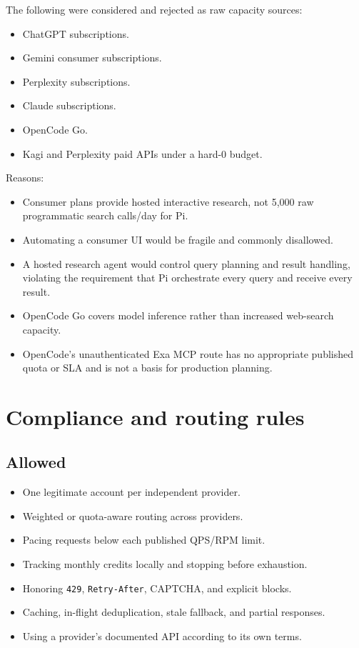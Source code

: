 \documentclass[11pt]{article}
\begin{document}
The following were considered and rejected as raw capacity sources:

\begin{itemize}
\item ChatGPT subscriptions.
\item Gemini consumer subscriptions.
\item Perplexity subscriptions.
\item Claude subscriptions.
\item OpenCode Go.
\item Kagi and Perplexity paid APIs under a hard-0 budget.
\end{itemize}

Reasons:

\begin{itemize}
\item Consumer plans provide hosted interactive research, not 5,000 raw
programmatic search calls/day for Pi.
\item Automating a consumer UI would be fragile and commonly disallowed.
\item A hosted research agent would control query planning and result handling,
violating the requirement that Pi orchestrate every query and receive every
result.
\item OpenCode Go covers model inference rather than increased web-search capacity.
\item OpenCode's unauthenticated Exa MCP route has no appropriate published quota
or SLA and is not a basis for production planning.
\end{itemize}
\section*{Compliance and routing rules}
\label{sec:orgb9e99f9}

\subsection*{Allowed}
\label{sec:org86a98b1}

\begin{itemize}
\item One legitimate account per independent provider.
\item Weighted or quota-aware routing across providers.
\item Pacing requests below each published QPS/RPM limit.
\item Tracking monthly credits locally and stopping before exhaustion.
\item Honoring \texttt{429}, \texttt{Retry-After}, CAPTCHA, and explicit blocks.
\item Caching, in-flight deduplication, stale fallback, and partial responses.
\item Using a provider's documented API according to its own terms.
\end{itemize}
\end{document}
